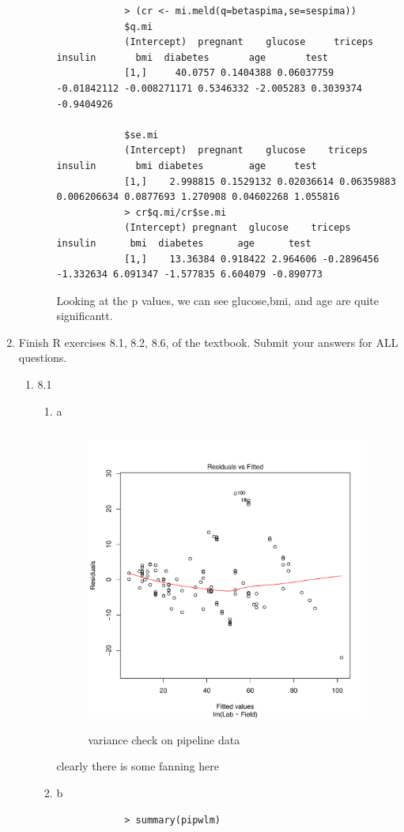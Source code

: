 \documentclass[11pt]{article}
\begin{document}
\begin{enumerate}
\begin{enumerate}
\begin{enumerate}
\begin{verbatim}
			> (cr <- mi.meld(q=betaspima,se=sespima))
			$q.mi
			(Intercept)  pregnant    glucose     triceps      insulin       bmi  diabetes       age       test
			[1,]     40.0757 0.1404388 0.06037759 -0.01842112 -0.008271171 0.5346332 -2.005283 0.3039374 -0.9404926
			
			$se.mi
			(Intercept)  pregnant    glucose    triceps     insulin       bmi diabetes        age     test
			[1,]    2.998815 0.1529132 0.02036614 0.06359883 0.006206634 0.0877693 1.270908 0.04602268 1.055816
			> cr$q.mi/cr$se.mi
			(Intercept) pregnant  glucose    triceps   insulin      bmi  diabetes      age      test
			[1,]    13.36384 0.918422 2.964606 -0.2896456 -1.332634 6.091347 -1.577835 6.604079 -0.890773
		\end{verbatim}
		Looking at the p values, we can see glucose,bmi, and age are quite significantt. 
	\end{enumerate}
\end{enumerate}
\item  Finish R exercises  8.1, 8.2, 8.6, of the textbook. Submit your
answers for {\color{red}ALL} questions. 
\begin{enumerate}
	\item 8.1
	\begin{enumerate}
		\item a
		\begin{figure}[H]
			\centering
			\includegraphics[width=10cm,height=10cm]{pipelinevar.pdf}
			\caption[paic]{variance check on pipeline data}
			\label{divusav}
		\end{figure}
		clearly there is some fanning here
		\item b
		\begin{verbatim}
			> summary(pipwlm)
			

\end{verbatim}
\end{enumerate}
\end{enumerate}
\end{enumerate}
\end{document}
